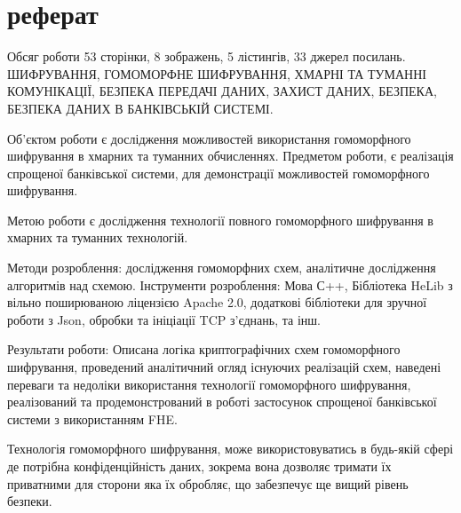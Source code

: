 \newpage
\chapter*{реферат}
Обсяг роботи 53 сторінки, 8 зображень, 5 лістингів, 33 джерел посилань.
ШИФРУВАННЯ, ГОМОМОРФНЕ ШИФРУВАННЯ, ХМАРНІ ТА ТУМАННІ КОМУНІКАЦІЇ, БЕЗПЕКА ПЕРЕДАЧІ ДАНИХ,
ЗАХИСТ ДАНИХ, БЕЗПЕКА, БЕЗПЕКА ДАНИХ В БАНКІВСЬКІЙ СИСТЕМІ.

Об'єктом роботи є дослідження можливостей використання гомоморфного шифрування в хмарних
та туманних обчисленнях. Предметом роботи, є реалізація спрощеної банківської системи, для
демонстрації можливостей гомоморфного шифрування.

Метою роботи є дослідження технології повного гомоморфного шифрування в хмарних та 
туманних технологій.

Методи розроблення: дослідження гомоморфних схем, аналітичне дослідження алгоритмів над
схемою. Інструменти розроблення: Мова С++, Бібліотека HeLib з вільно поширюваною ліцензією
Apache 2.0, додаткові бібліотеки для зручної роботи з Json, обробки та ініціації TCP 
з'єднань, та інш. 

Результати роботи: Описана логіка криптографічних схем гомоморфного шифрування, проведений
аналітичний огляд існуючих реалізацій схем, наведені переваги та недоліки використання 
технології гомоморфного шифрування, реалізований та продемонстрований в роботі застосунок
спрощеної банківської системи з використанням FHE.

Технологія гомоморфного шифрування, може використовуватись в будь-якій сфері де потрібна
конфіденційність даних, зокрема вона дозволяє тримати їх приватними для сторони яка їх
обробляє, що забезпечує ще вищий рівень безпеки.
